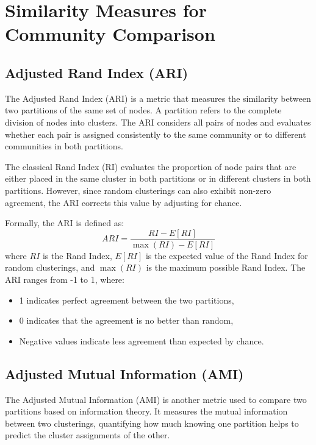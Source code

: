 \section{Similarity Measures for Community Comparison}

\subsection{Adjusted Rand Index (ARI)}

The Adjusted Rand Index (ARI) is a metric that measures the similarity
between two partitions of the same set of nodes. 
A partition refers to the complete division of nodes into clusters.
The ARI considers all pairs of nodes and evaluates whether each pair is assigned consistently to
the same community or to different communities in both partitions.

The classical Rand Index (RI) evaluates the proportion of node pairs that 
are either placed in the same cluster in both partitions or in different clusters in both partitions.
However, since random clusterings can also exhibit non-zero agreement,
the ARI corrects this value by adjusting for chance.

Formally, the ARI is defined as:
\begin{equation}
    ARI = \frac{RI - E[RI]}{\max(RI) - E[RI]}
\end{equation}
where $RI$ is the Rand Index, $E[RI]$ is the expected value of the Rand Index for random clusterings, 
and $\max(RI)$ is the maximum possible Rand Index.
The ARI ranges from -1 to 1, where:
\begin{itemize}
    \item 1 indicates perfect agreement between the two partitions,
    \item 0 indicates that the agreement is no better than random,
    \item Negative values indicate less agreement than expected by chance.
\end{itemize}

\subsection{Adjusted Mutual Information (AMI)}

The Adjusted Mutual Information (AMI) is another metric used to compare two partitions 
based on information theory. It measures the mutual information between two clusterings, 
quantifying how much knowing one partition helps to predict the cluster assignments of the other.

